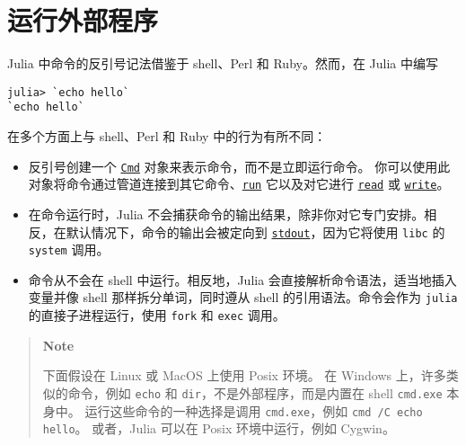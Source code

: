 

\hypertarget{12867141128563676518}{}


\chapter{运行外部程序}



Julia 中命令的反引号记法借鉴于 shell、Perl 和 Ruby。然而，在 Julia 中编写




\begin{verbatim}
julia> `echo hello`
`echo hello`
\end{verbatim}



在多个方面上与 shell、Perl 和 Ruby 中的行为有所不同：



\begin{itemize}
\item 反引号创建一个 \hyperlink{10541952265148699805}{\texttt{Cmd}} 对象来表示命令，而不是立即运行命令。 你可以使用此对象将命令通过管道连接到其它命令、\hyperlink{18309243184998755104}{\texttt{run}} 它以及对它进行 \hyperlink{8104134490906192097}{\texttt{read}} 或 \hyperlink{16947913578760238729}{\texttt{write}}。


\item 在命令运行时，Julia 不会捕获命令的输出结果，除非你对它专门安排。相反，在默认情况下，命令的输出会被定向到 \hyperlink{18181294266083891471}{\texttt{stdout}}，因为它将使用 \texttt{libc} 的 \texttt{system} 调用。


\item 命令从不会在 shell 中运行。相反地，Julia 会直接解析命令语法，适当地插入变量并像 shell 那样拆分单词，同时遵从 shell 的引用语法。命令会作为 \texttt{julia} 的直接子进程运行，使用 \texttt{fork} 和 \texttt{exec} 调用。

\end{itemize}


\begin{quote}
\textbf{Note}

下面假设在 Linux 或 MacOS 上使用 Posix 环境。 在 Windows 上，许多类似的命令，例如 \texttt{echo} 和 \texttt{dir}，不是外部程序，而是内置在 shell \texttt{cmd.exe} 本身中。 运行这些命令的一种选择是调用 \texttt{cmd.exe}，例如 \texttt{cmd /C echo hello}。 或者，Julia 可以在 Posix 环境中运行，例如 Cygwin。

\end{quote}


